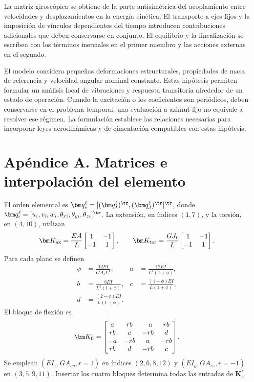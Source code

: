 La matriz giroscópica se obtiene de la parte antisimétrica del acoplamiento entre velocidades y desplazamientos en la energía cinética. El transporte a ejes fijos y la imposición de vínculos dependientes del tiempo introducen contribuciones adicionales que deben conservarse en conjunto. El equilibrio y la linealización se escriben con los términos inerciales en el primer miembro y las acciones externas en el segundo.

El modelo considera pequeñas deformaciones estructurales, propiedades de masa de referencia y velocidad angular nominal constante. Estas hipótesis permiten formular un análisis local de vibraciones y respuesta transitoria alrededor de un estado de operación. Cuando la excitación o los coeficientes son periódicos, deben conservarse en el problema temporal; una evaluación a azimut fijo no equivale a resolver ese régimen. La formulación establece las relaciones necesarias para incorporar leyes aerodinámicas y de cimentación compatibles con estas hipótesis.

\section{Apéndice A. Matrices e interpolación del elemento}
El orden elemental es $\bm q_e^\ell=[(\bm q_I^\ell)^\tr,(\bm q_J^\ell)^\tr]^\tr$, donde $\bm q_i^\ell=[u_i,v_i,w_i,\theta_{xi},\theta_{yi},\theta_{zi}]^\tr$. La extensión, en índices $(1,7)$, y la torsión, en $(4,10)$, utilizan
\begin{equation}
\bm K_{\rm ax}=\frac{EA}{L}\begin{bmatrix}1&-1\\-1&1\end{bmatrix},\qquad
\bm K_{\rm tor}=\frac{GJ_t}{L}\begin{bmatrix}1&-1\\-1&1\end{bmatrix}.
\end{equation}
Para cada plano se definen
\begin{align}
\phi&=\frac{12EI}{GA_sL^2},&a&=\frac{12EI}{L^3(1+\phi)},\nonumber\\
b&=\frac{6EI}{L^2(1+\phi)},&c&=\frac{(4+\phi)EI}{L(1+\phi)},\nonumber\\
d&=\frac{(2-\phi)EI}{L(1+\phi)}.
\end{align}
El bloque de flexión es
\begin{equation}
\bm K_{\rm fl}=\begin{bmatrix}
a&rb&-a&rb\\rb&c&-rb&d\\-a&-rb&a&-rb\\rb&d&-rb&c
\end{bmatrix}.
\end{equation}
Se emplean $(EI_z,GA_{sy},r=1)$ en índices $(2,6,8,12)$ y $(EI_y,GA_{sz},r=-1)$ en $(3,5,9,11)$. Insertar los cuatro bloques determina todas las entradas de $\bm K_e^\ell$.

